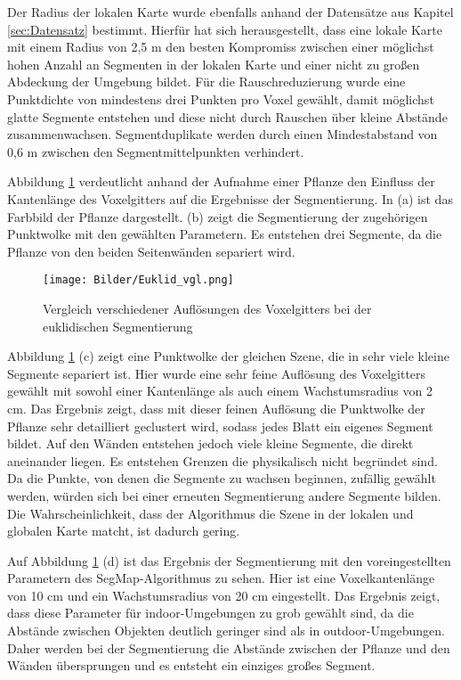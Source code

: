 Der Radius der lokalen Karte wurde ebenfalls anhand der Datensätze aus Kapitel \ref{sec:Datensatz} bestimmt. Hierfür hat sich herausgestellt, dass eine lokale Karte mit einem Radius von 2,5 m den besten Kompromiss zwischen einer möglichst hohen Anzahl an Segmenten in der lokalen Karte und einer nicht zu großen Abdeckung der Umgebung bildet. Für die Rauschreduzierung wurde eine Punktdichte von mindestens drei Punkten pro Voxel gewählt, damit möglichst glatte Segmente entstehen und diese nicht durch Rauschen über kleine Abstände zusammenwachsen. Segmentduplikate werden durch einen Mindestabstand von 0,6 m zwischen den Segmentmittelpunkten verhindert. 

Abbildung \ref{fig:vgl_euklid} verdeutlicht anhand der Aufnahme einer Pflanze den Einfluss der Kantenlänge des Voxelgitters auf die Ergebnisse der Segmentierung. In (a) ist das Farbbild der Pflanze dargestellt. (b) zeigt die Segmentierung der zugehörigen Punktwolke mit den gewählten Parametern. Es entstehen drei Segmente, da die Pflanze von den beiden Seitenwänden separiert wird. 

\begin{figure}[htb]
	\centering
	\texttt{[image: Bilder/Euklid\_vgl.png]}
	\caption{Vergleich verschiedener Auflösungen des Voxelgitters bei der euklidischen Segmentierung}
	\label{fig:vgl_euklid}
\end{figure}

Abbildung \ref{fig:vgl_euklid} (c) zeigt eine Punktwolke der gleichen Szene, die in sehr viele kleine Segmente separiert ist. Hier wurde eine  sehr feine Auflösung des Voxelgitters gewählt mit sowohl einer Kantenlänge als auch einem Wachstumsradius von 2 cm. Das Ergebnis zeigt, dass mit dieser feinen Auflösung die Punktwolke der Pflanze sehr   detailliert geclustert wird, sodass jedes Blatt ein eigenes Segment bildet. Auf den Wänden entstehen jedoch viele kleine Segmente, die direkt aneinander liegen. Es entstehen Grenzen die physikalisch nicht begründet sind. Da die Punkte, von denen die Segmente zu wachsen beginnen, zufällig gewählt werden, würden sich bei einer erneuten Segmentierung andere Segmente bilden. Die Wahrscheinlichkeit, dass der Algorithmus die Szene in der lokalen und globalen Karte matcht, ist dadurch gering.

Auf Abbildung \ref{fig:vgl_euklid} (d) ist das Ergebnis der Segmentierung mit den voreingestellten Parametern des SegMap-Algorithmus zu sehen. Hier ist eine Voxelkantenlänge von 10 cm und ein Wachstumsradius von 20 cm eingestellt. Das Ergebnis zeigt, dass diese Parameter für indoor-Umgebungen zu grob gewählt sind, da die Abstände zwischen Objekten deutlich geringer sind als in outdoor-Umgebungen. Daher werden bei der Segmentierung die Abstände zwischen der Pflanze und den Wänden übersprungen und es entsteht ein einziges großes Segment. 

